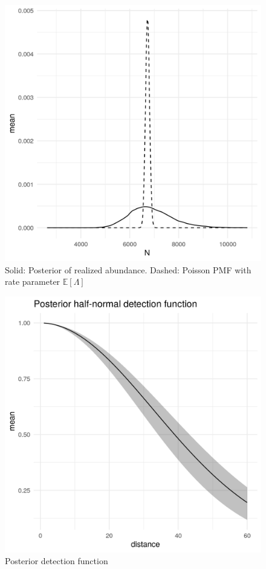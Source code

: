 \documentclass[preprint,12pt]{elsarticle}
\begin{document}
\begin{figure}
	\includegraphics[scale=0.6]{figures/realized_abundance_vs_exp.png}
	\caption{Solid:  Posterior of realized abundance.  Dashed:  Poisson PMF with rate parameter $\mathbb{E}[\Lambda]$}
	\label{fig:realized-abundance-comparison}
\end{figure}

\begin{figure}
	\includegraphics[scale=0.6]{figures/halfnormal.png}
	\caption{Posterior detection function}
	\label{fig:half-normal}
\end{figure}
\end{document}
